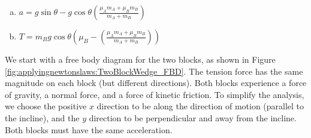 \begin{finalanswer}
\begin{enumerate}[(a)]
\item $a = g\sin\theta-g\cos\theta\left( \frac{\mu_A m_A+\mu_B m_B}{m_A+m_B} \right)$
\item $T = m_Bg\cos\theta\left(  \mu_B  - \left( \frac{\mu_A m_A+\mu_B m_B}{m_A+m_B} \right) \right)$
\end{enumerate}
\end{finalanswer}
\begin{solution}
We start with a free body diagram for the two blocks, as shown in Figure \ref{fig:applyingnewtonslaws:TwoBlockWedge_FBD}. The tension force has the same magnitude on each block (but different directions). Both blocks experience a force of gravity, a normal force, and a force of kinetic friction. 
To simplify the analysis, we choose the positive $x$ direction to be along the direction of motion (parallel to the incline), and the $y$ direction to be perpendicular and away from the incline. Both blocks must have the same acceleration.


\end{solution}
